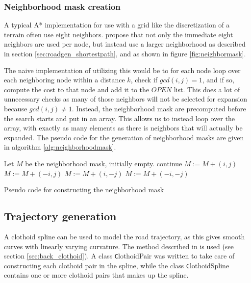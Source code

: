 \subsubsection{Neighborhood mask creation}
A typical A* implementation for use with a grid like the discretization of a terrain often use eight neighbors. \cite{roadgen} propose that not only the immediate eight neighbors are used per node, but instead use a larger neighborhood as described in section \ref{sec:roadgen_shortestpath}, and as shown in figure \ref{fig:neighbormask}. 

The naive implementation of utilizing this would be to for each node loop over each neighboring node within a distance $k$, check if $gcd(i,j)=1$, and if so, compute the cost to that node and add it to the $OPEN$ list. This does a lot of unnecessary checks as many of those neighbors will not be selected for expansion because $gcd(i,j)\neq 1$. Instead, the neighborhood mask are precomputed before the search starts and put in an array. This allows us to instead loop over the array, with exactly as many elements as there is neighbors that will actually be expanded. The pseudo code for the generation of neighborhood masks are given in algorithm \ref{alg:neighborhoodmask}.

\begin{algorithm}
\begin{algorithmic}
\STATE Let $M$ be the neighborhood mask, initially empty.
            \STATE continue
        \ENDIF
        \STATE $M := M + (i,j)$
            \STATE $M := M + (-i,j)$
            \STATE $M := M + (i,-j)$
            \STATE $M := M + (-i,-j)$
        \ENDIF
    \ENDFOR
\ENDFOR
\end{algorithmic}
\caption{Pseudo code for constructing the neighborhood mask}
\label{alg:neighborhoodmask}
\end{algorithm}

\subsection{Trajectory generation} 
A clothoid spline can be used to model the road trajectory, as this gives smooth curves with linearly varying curvature. The method described in \cite{clothoid} is used (see section \ref{sec:back_clothoid}). A class {\texttt ClothoidPair} was written to take care of constructing each clothoid pair in the spline, while the class {\texttt ClothoidSpline} contains one or more clothoid pairs that makes up the spline.

